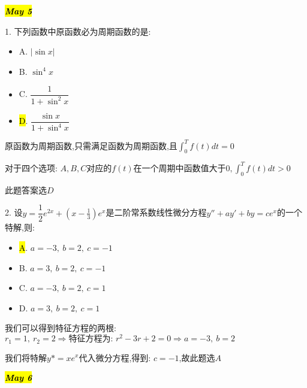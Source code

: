 \hl{\textbf{\textit{May 5}}}

1. 下列函数中原函数必为周期函数的是: 
\begin{itemize}
	\item A. $|\sin x|$ 
	\item B. $\sin^4 x$ 
	\item C. $\dfrac{1}{1+\sin^2x}$ 
	\item \hl{D}. $\dfrac{\sin x}{1+\sin^4 x}$ 
\end{itemize}
\begin{solution}
	
	原函数为周期函数,只需满足函数为周期函数,且$\int_{0}^{T}f(t)dt=0$
	
	对于四个选项: $A,B,C\text{对应的}f(t)\text{在一个周期中函数值大于0},\int_{0}^{T}f(t)dt>0$
	
	此题答案选$D$
\end{solution}

2. 设$y=\dfrac{1}{2}e^{2x}+(x-\frac{1}{3})e^{x}$是二阶常系数线性微分方程$y''+ay'+by=ce^x$的一个特解,则: 
\begin{itemize}
	\item \hl{A}. $a=-3,\ b=2,\ c=-1$ 
	\item B. $a=3,\ b=2,\ c=-1$ 
	\item C. $a=-3,\ b=2,\ c=1$ 
	\item D. $a=3,\ b=2,\ c=1$ 
\end{itemize}
\begin{solution}
	
	我们可以得到特征方程的两根: $r_{1}=1,\ r_{2}=2\Rightarrow \text{特征方程为: }r^2-3r+2=0\Rightarrow a=-3,\ b=2$
	
	我们将特解$y{*}=xe^{x}$代入微分方程,得到: $c=-1$,故此题选$A$
\end{solution}

\hl{\textbf{\textit{May 6}}}

